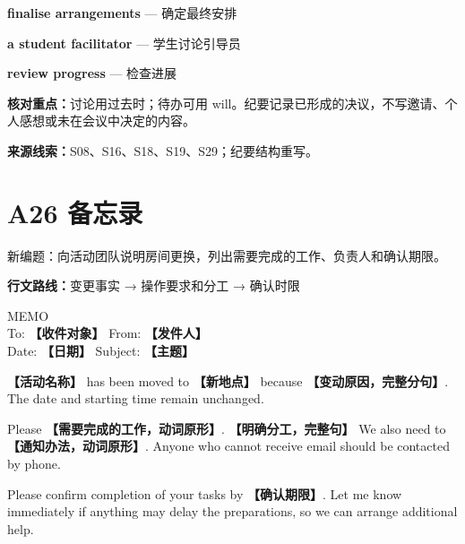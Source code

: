 \documentclass[11pt,a4paper,fontset=macnew]{ctexart}
\newenvironment{writing}{\begingroup\fontsize{10.5}{13.5}\selectfont\setlength{\parskip}{3pt}}{\par\endgroup}
\begin{document}
\par\vspace{4pt}{\bfseries 好词好句：优先记这三处}\par\nopagebreak
{\small\textbf{finalise arrangements} — 确定最终安排}\par
{\small\textbf{a student facilitator} — 学生讨论引导员}\par
{\small\textbf{review progress} — 检查进展}\par
{\small\textbf{核对重点：}讨论用过去时；待办可用 will。纪要记录已形成的决议，不写邀请、个人感想或未在会议中决定的内容。}\par
{\fontsize{8}{10}\selectfont\textbf{来源线索：}S08、S16、S18、S19、S29；纪要结构重写。}\par
\clearpage\section*{A26  备忘录}
{\small 新编题：向活动团队说明房间更换，列出需要完成的工作、负责人和确认期限。}\par
{\small\textbf{行文路线：}变更事实 → 操作要求和分工 → 确认时限}\par
\par\vspace{4pt}{\bfseries 可替换模板}\par\nopagebreak
\begin{writing}
\noindent MEMO\\To: {\bfseries 【收件对象】}   From: {\bfseries 【发件人】}\\Date: {\bfseries 【日期】}   Subject: {\bfseries 【主题】}\par
{\bfseries 【活动名称】} has been moved to {\bfseries 【新地点】} because {\bfseries 【变动原因，完整分句】}. The date and starting time remain unchanged.

Please {\bfseries 【需要完成的工作，动词原形】}. {\bfseries 【明确分工，完整句】} We also need to {\bfseries 【通知办法，动词原形】}. Anyone who cannot receive email should be contacted by phone.

Please confirm completion of your tasks by {\bfseries 【确认期限】}. Let me know immediately if anything may delay the preparations, so we can arrange additional help.

\end{writing}
\par\vspace{4pt}{\bfseries 完整套用示例}\par\nopagebreak
\end{document}
